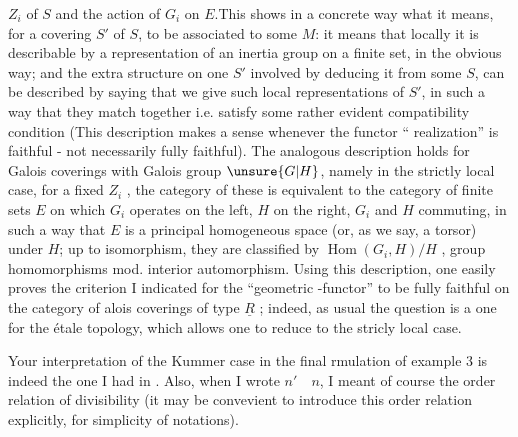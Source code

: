 $Z_i$ of $S$ and the action of $G_i$ on $E$.This shows in a  concrete way what it means,  for a covering $S'$ of $S$, to be associated to some $M$: it means that locally it is describable by a representation of an inertia group on a finite set, in the obvious way; and the extra structure on one $S'$ involved by deducing it from some $S$, can be described by saying that we give such local representations of $S'$, in such a way that they match together i.e. satisfy some rather evident compatibility condition (This description makes a sense whenever the functor `` realization'' is faithful - not necessarily fully faithful). The analogous description holds for Galois coverings with Galois group $\unsure{G|H}$, namely in the strictly local case, for a fixed $Z_i$ , the category of these is equivalent to the category of finite sets $E$ on which $G_i$ operates on the left, $H$ on the right, $G_i$ and $H$ commuting, in such a way that $E$ is a principal homogeneous space (or, as we say, a torsor) under $H$; up to isomorphism, they are classified by $\operatorname{Hom}(G_i,H)/H$ , group homomorphisms mod. interior automorphism. Using  this description, one easily proves the criterion I indicated for the ``geometric -functor'' to be fully faithful on the category of alois coverings of type $\underline{R}$ ; indeed, as usual the question is a  one for the étale topology, which allows one to  reduce to the stricly local case.

Your interpretation of the Kummer case in the final rmulation of example 3 is indeed the one I had in . Also, when I wrote $n'\quad n$, I meant of course the order relation of divisibility (it may be convevient to introduce this order relation explicitly, for simplicity of notations).
